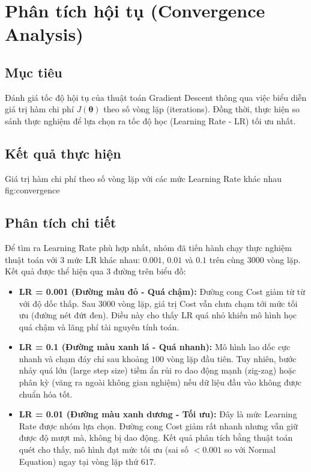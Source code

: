 \section{Phân tích hội tụ (Convergence Analysis)}

\subsection{Mục tiêu}
Đánh giá tốc độ hội tụ của thuật toán Gradient Descent thông qua việc biểu diễn giá trị hàm chi phí \(J(\boldsymbol{\theta})\) theo số vòng lặp (iterations). Đồng thời, thực hiện so sánh thực nghiệm để lựa chọn ra tốc độ học (Learning Rate - LR) tối ưu nhất.

\subsection{Kết quả thực hiện}

{Giá trị hàm chi phí theo số vòng lặp với các mức Learning Rate khác nhau}
{fig:convergence}

\subsection{Phân tích chi tiết}
Để tìm ra Learning Rate phù hợp nhất, nhóm đã tiến hành chạy thực nghiệm thuật toán với 3 mức LR khác nhau: \(0.001\), \(0.01\) và \(0.1\) trên cùng \(3000\) vòng lặp. Kết quả được thể hiện qua 3 đường trên biểu đồ:

\begin{itemize}
    \item \textbf{LR = 0.001 (Đường màu đỏ - Quá chậm):} Đường cong Cost giảm từ từ với độ dốc thấp. Sau \(3000\) vòng lặp, giá trị Cost vẫn chưa chạm tới mức tối ưu (đường nét đứt đen). Điều này cho thấy LR quá nhỏ khiến mô hình học quá chậm và lãng phí tài nguyên tính toán.
    
    \item \textbf{LR = 0.1 (Đường màu xanh lá - Quá nhanh):} Mô hình lao dốc cực nhanh và chạm đáy chỉ sau khoảng \(100\) vòng lặp đầu tiên. Tuy nhiên, bước nhảy quá lớn (large step size) tiềm ẩn rủi ro dao động mạnh (zig-zag) hoặc phân kỳ (văng ra ngoài không gian nghiệm) nếu dữ liệu đầu vào không được chuẩn hóa tốt.
    
    \item \textbf{LR = 0.01 (Đường màu xanh dương - Tối ưu):} Đây là mức Learning Rate được nhóm lựa chọn. Đường cong Cost giảm rất nhanh nhưng vẫn giữ được độ mượt mà, không bị dao động. Kết quả phân tích bằng thuật toán quét cho thấy, mô hình đạt mức tối ưu (sai số \(< 0.001\) so với Normal Equation) ngay tại vòng lặp thứ \(617\).
\end{itemize}

